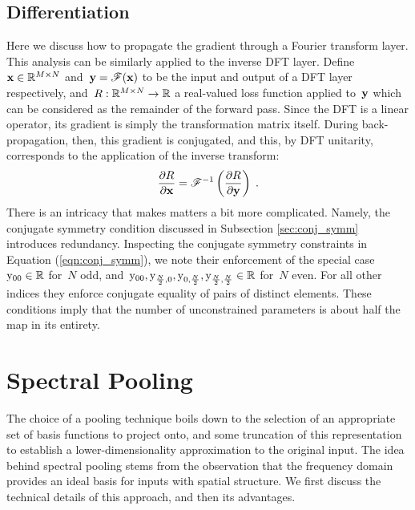 \documentclass{article} %
\begin{document}
\subsection{Differentiation}
\label{sec:diff}
Here we discuss how to propagate the gradient through a Fourier transform layer. This analysis can be similarly applied to the inverse DFT layer.  Define~${\boldsymbol{\mathrm{x}}\in\mathbb{R}^{M\times N}}$ and~${\boldsymbol{\mathrm{y}} = \mathscr{F}(\boldsymbol{\mathrm{x}})}$ to be the input and output of a DFT layer respectively, and~${R:\mathbb{R}^{M\times N}\rightarrow\mathbb{R}}$ a real-valued loss function applied to~$\boldsymbol{\mathrm{y}}$ which can be considered as the remainder of the forward pass. Since the DFT is a linear operator, its gradient is simply the transformation matrix itself. During back-propagation, then, this gradient is conjugated, and this, by DFT unitarity, corresponds to the application of the inverse transform:
\begin{align}
\frac{\partial R}{\partial\boldsymbol{\mathrm{x}}} = \mathscr{F}^{-1}\left(\frac{\partial R}{\partial\boldsymbol{\mathrm{y}}}\right)\;.
\end{align}
There is an intricacy that makes matters a bit more complicated. Namely, the conjugate symmetry condition discussed in Subsection \ref{sec:conj_symm} introduces redundancy. Inspecting the conjugate symmetry constraints in Equation (\ref{eqn:conj_symm}), we note their enforcement of the special case~${\mathrm{y}_{00}\in\mathbb{R}}$ for~$N$ odd, and~${\mathrm{y}_{00}, \mathrm{y}_{\frac{N}{2}, 0}, \mathrm{y}_{0, \frac{N}{2}}, \mathrm{y}_{\frac{N}{2}, \frac{N}{2}}\in \mathbb{R}}$ for~$N$ even. For all other indices they enforce conjugate equality of pairs of distinct elements. These conditions imply that the number of unconstrained parameters is about half the map in its entirety.

\section{Spectral Pooling}
\label{sec:spectral_pooling}

The choice of a pooling technique boils down to the selection of an appropriate set of basis functions to project onto, and some truncation of this representation to establish a lower-dimensionality approximation to the original input. The idea behind spectral pooling stems from the observation that the frequency domain provides an ideal basis for inputs with spatial structure. We first discuss the technical details of this approach, and then its advantages.
\end{document}
